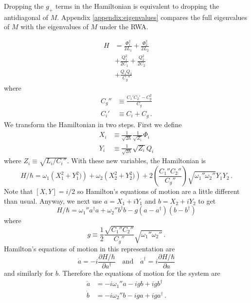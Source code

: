 Dropping the $g_+$ terms in the Hamiltonian is equivalent to dropping the antidiagonal of $M$.
Appendix \ref{appendix:eigenvalues} compares the full eigenvalues of $M$ with the eigenvalues of $M$ under the RWA.



\begin{align}
  H
  &= \frac{\Phi_1^2}{2 L_1} + \frac{\Phi_2^2}{2 L_2} \\
  &+ \frac{Q_1^2}{2 C_1} + \frac{Q_2^2}{2 C_2} \\
  &+ \frac{Q_1 Q_2}{C_g''}
\end{align}
where
\begin{align}
  C_g'' &\equiv \frac{C_1' C_2' - C_g^2}{C_g} \\
  C_i' &\equiv C_i + C_g \, .
\end{align}
We transform the Hamiltonian in two steps.
First we define
\begin{align*}
  X_i &\equiv \frac{1}{\sqrt{2 \hbar}} \frac{1}{\sqrt{Z_i}} \Phi_i \\
  Y_i &\equiv \frac{1}{\sqrt{2 \hbar}} \sqrt{Z_i} Q_i
\end{align*}
where $Z_i \equiv \sqrt{L_i / C_i''}$.
With these new variables, the Hamiltonian is
\begin{equation}
  H/\hbar =
    \omega_1 \left(X_1^2 + Y_1^2) \right)
  + \omega_2 \left(X_2^2 + Y_2^2) \right)
  + 2 \left( \frac{C_1'' C_2''}{C_g''} \right) \sqrt{\omega_1'' \omega_2''} Y_1 Y_2 \, .
\end{equation}
Note that $[X, Y] = i/2$ so Hamilton's equations of motion are a little different than usual.
Anyway, we next use $a = X_1 + i Y_1$ and $b = X_2 + i Y_2$ to get
\begin{equation}
  H / \hbar =
    \omega_1'' a^\dagger a
  + \omega_2'' b^\dagger b
  - g (a - a^\dagger) (b - b^\dagger)
\end{equation}
where
\begin{equation}
  g \equiv \frac{1}{2} \frac{\sqrt{C_1'' C_2''}}{C_g''} \sqrt{\omega_1'' \omega_2''} \, .
\end{equation}
Hamilton's equations of motion in this representation are
\begin{equation*}
  \dot{a} = -i \frac{\partial H/\hbar}{\partial a^\dagger}
  \quad \text{and} \quad
  \dot{a}^\dagger = i \frac{\partial H/\hbar}{\partial a}
\end{equation*}
and similarly for $b$.
Therefore the equations of motion for the system are
\begin{align*}
  \dot a &= -i \omega_1'' a -i g b + i g b^\dagger \\
  \dot b &= -i \omega_2'' b -i g a + i g a^\dagger \, .
\end{align*}
